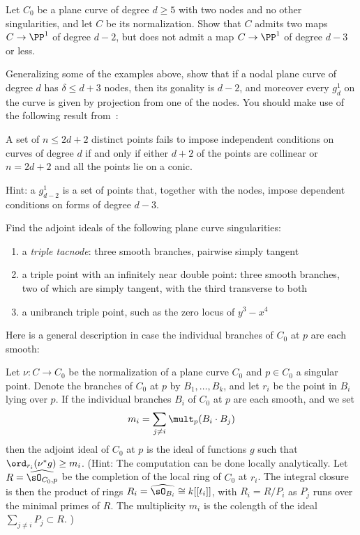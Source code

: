 \begin{exercise}
Let $C_0$ be a plane curve of degree $d\geq 5$ with two nodes and no other singularities, and let $C$ be its normalization. Show that $C$ admits two maps $C \to \PP^1$ of degree $d-2$, but does not admit a map $C \to \PP^1$ of degree $d-3$ or less.
\end{exercise}

\begin{exercise}
Generalizing some of the examples above, show that if a nodal plane curve of degree $d$ has $\delta\leq d+3$ nodes,
then its gonality is $d-2$, and moreover every $g^1_d$ on the curve is given by projection from one of the nodes.
You should make use of the following result from~\cite[p. 302]{MR1376653}:
\begin{proposition}
 A set of $n \leq 2d+ 2$ distinct
points fails to impose independent conditions on curves of degree
$d$ if and only if either $d + 2$ of the points  are collinear or $n = 2d + 2$ and all the points lie
on a conic.
\end{proposition} 
Hint: a $g^1_{d-2}$ is a set of points that, together with the nodes, impose dependent conditions on forms of degree $d-3$.
\end{exercise}

\begin{exercise}
Find the adjoint ideals of the following plane curve singularities:
\begin{enumerate}
\item a \emph{triple tacnode}: three smooth branches, pairwise simply tangent
\item a triple point with an infinitely near double point: three smooth branches, two of which are simply tangent, with the third transverse to both
\item a unibranch triple point, such as the zero locus of $y^3-x^4$
\end{enumerate}
\end{exercise}

Here is a  general description in case the individual branches of $C_0$ at $p$ are each smooth:

\begin{exercise}
Let $\nu : C \to C_0$ be the normalization of a plane curve $C_0$ and $p \in C_0$ a singular point. Denote the branches of $C_0$ at $p$ by $B_1,\dots,B_k$, and let $r_i$ be the point in $B_i$ lying over $p$. If the individual branches $B_i$ of $C_0$ at $p$ are each smooth, and we set
$$
m_i = \sum_{j \neq i} \mult_p(B_i \cdot B_j)
$$
then the adjoint ideal of $C_0$ at $p$ is the ideal of functions $g$ such that $\ord_{r_i}(\nu^*g) \geq m_i$.
(Hint: The computation can be done locally analytically. Let $R = \widehat{\sO_{C_0, p}}$ be the completion of the local ring
of $C_0$ at $r_i$. The integral closure is then the product of rings $R_i = \widehat{\sO_{B_i}} \cong k[[t_i]]$,
with $R_i = R/P_i$ as $P_j$ runs over the minimal primes of $R$. The multiplicity
$m_i$ is the colength of the ideal $\sum_{j\neq i}P_j \subset R$.
)
\end{exercise}


